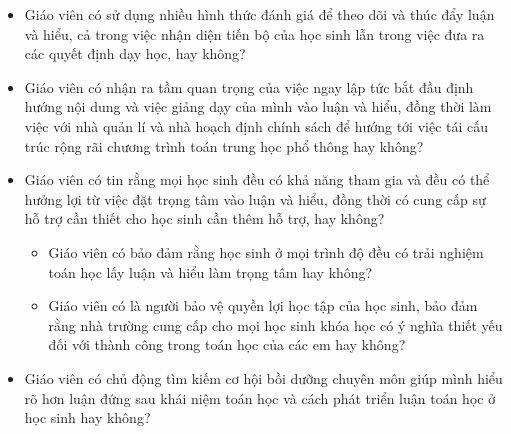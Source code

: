 {{\begin{itemize}
        \item Giáo viên có sử dụng nhiều hình thức đánh giá để theo dõi và thúc đẩy luận và hiểu, cả trong việc nhận diện tiến bộ của học sinh lẫn trong việc đưa ra các quyết định dạy học, hay không?
        
        \item Giáo viên có nhận ra tầm quan trọng của việc ngay lập tức bắt đầu định hướng nội dung và việc giảng dạy của mình vào luận và hiểu, đồng thời làm việc với nhà quản lí và nhà hoạch định chính sách để hướng tới việc tái cấu trúc rộng rãi chương trình toán trung học phổ thông hay không?
        
        \item Giáo viên có tin rằng mọi học sinh đều có khả năng tham gia và đều có thể hưởng lợi từ việc đặt trọng tâm vào luận và hiểu, đồng thời có cung cấp sự hỗ trợ cần thiết cho học sinh cần thêm hỗ trợ, hay không?
          \begin{itemize}
            \item Giáo viên có bảo đảm rằng học sinh ở mọi trình độ đều có trải nghiệm toán học lấy luận và hiểu làm trọng tâm hay không?
            
            \item Giáo viên có là người bảo vệ quyền lợi học tập của học sinh, bảo đảm rằng nhà trường cung cấp cho mọi học sinh khóa học có ý nghĩa thiết yếu đối với thành công trong toán học của các em hay không?
          \end{itemize}

        \item Giáo viên có chủ động tìm kiếm cơ hội bồi dưỡng chuyên môn giúp mình hiểu rõ hơn luận đứng sau khái niệm toán học và cách phát triển luận toán học ở học sinh hay không?
      \end{itemize}}
  }
